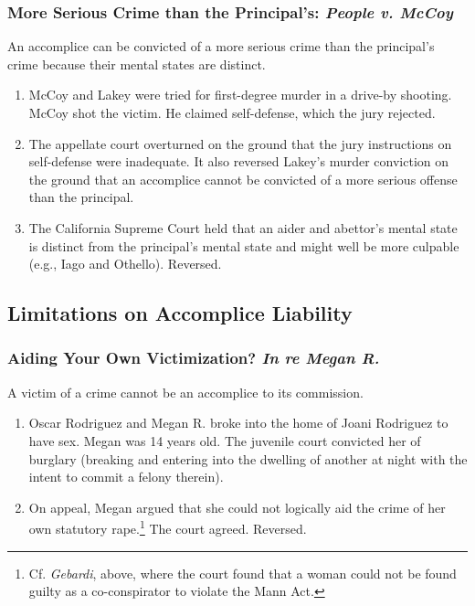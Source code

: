 \subsubsection{More Serious Crime than the Principal's: \emph{People v. McCoy}}

An accomplice can be convicted of a more serious crime than the principal's 
crime because their mental states are distinct.

\begin{enumerate}
    \item McCoy and Lakey were tried for first-degree murder in a drive-by 
    shooting. McCoy shot the victim. He claimed self-defense, which the jury 
    rejected.
    \item The appellate court overturned on the ground that the jury 
    instructions on self-defense were inadequate. It also reversed Lakey's 
    murder conviction on the ground that an accomplice cannot be convicted of 
    a more serious offense than the principal.
    \item The California Supreme Court held that an aider and abettor's mental 
    state is distinct from the principal's mental state and might well be 
    more culpable (e.g., Iago and Othello). Reversed.
\end{enumerate}

\subsection{Limitations on Accomplice Liability}

\subsubsection{Aiding Your Own Victimization? \emph{In re Megan R.}}

A victim of a crime cannot be an accomplice to its commission.

\begin{enumerate}
    \item Oscar Rodriguez and Megan R. broke into the home of Joani Rodriguez 
    to have sex. Megan was 14 years old. The juvenile court convicted her of 
    burglary (breaking and entering into the dwelling of another at night with 
    the intent to commit a felony therein).
    \item On appeal, Megan argued that she could not logically aid the crime 
    of her own statutory rape.\footnote{Cf. \emph{Gebardi}, above, where the 
    court found that a woman could not be found guilty as a co-conspirator to 
    violate the Mann Act.} The court agreed. Reversed.
\end{enumerate}

